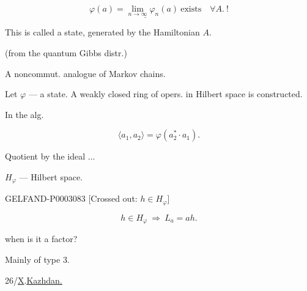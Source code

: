 \begin{equation*}\underline{\varphi (a)=\lim_{n\to\infty}\varphi_n (a)\ \text{exists}}\quad\forall A.\ !\end{equation*}





This is called a state, generated by the Hamiltonian $A$.

(from the quantum Gibbs distr.)

A noncommut. analogue of Markov chains.

Let $\varphi$ --- a state. A weakly closed ring of opers. in Hilbert space is constructed.

In the alg.

\begin{equation*}\langle a_1, a_2\rangle=\varphi (a_2^*\cdot a_1).\end{equation*}

Quotient by the ideal $\ldots$

$H_\varphi$ --- Hilbert space.

\begin{GelfandAdjacentEvidence}{GELFAND-P000308}{3}
[Crossed out: $h\in H_\varphi$]

\end{GelfandAdjacentEvidence}


\begin{equation*}h\in H_\varphi\ \Longrightarrow\ L_a=ah.\end{equation*}






when is it a factor?

Mainly of type 3.



26/\underline{X}.\qquad\underline{\underline{Kazhdan.}}

\hfill{}

